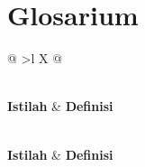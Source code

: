 \documentclass[12pt,a4paper]{report}
\begin{document}
\chapter*{Glosarium}

\begingroup
\small
\begin{xltabular}{\textwidth}{@{} >{\bfseries}l X @{}}
\caption{Glosarium: Istilah Teknis dalam Manajemen Arsip Digital}\\
\toprule
\textbf{Istilah} & \textbf{Definisi} \\
\midrule
\endfirsthead

\\
\toprule
\textbf{Istilah} & \textbf{Definisi} \\
\midrule
\endhead

\bottomrule
\endfoot


\end{xltabular}
\end{document}
